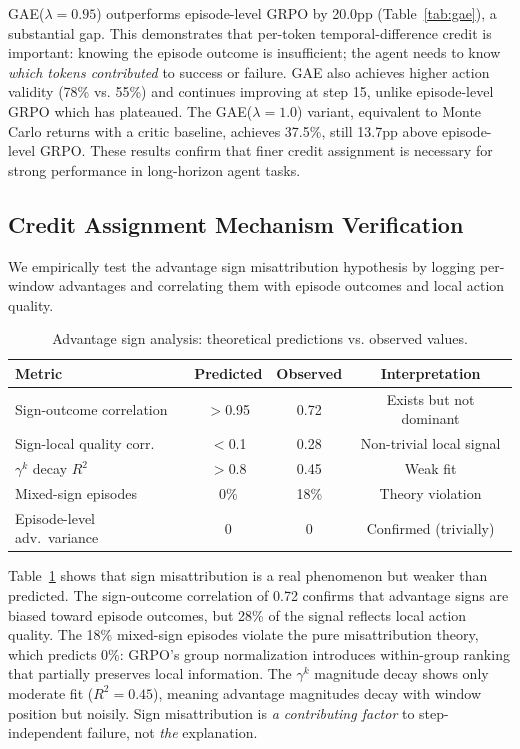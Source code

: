 \documentclass[11pt]{article}
\begin{document}
GAE($\lambda{=}0.95$) outperforms episode-level GRPO by 20.0pp (Table~\ref{tab:gae}), a substantial gap.
This demonstrates that per-token temporal-difference credit is important: knowing the episode outcome is insufficient; the agent needs to know \emph{which tokens contributed} to success or failure.
GAE also achieves higher action validity (78\% vs. 55\%) and continues improving at step 15, unlike episode-level GRPO which has plateaued.
The GAE($\lambda{=}1.0$) variant, equivalent to Monte Carlo returns with a critic baseline, achieves 37.5\%, still 13.7pp above episode-level GRPO.
These results confirm that finer credit assignment is necessary for strong performance in long-horizon agent tasks.

\subsection{Credit Assignment Mechanism Verification}

We empirically test the advantage sign misattribution hypothesis by logging per-window advantages and correlating them with episode outcomes and local action quality.

\begin{table}[h]
\centering
\caption{Advantage sign analysis: theoretical predictions vs. observed values.}
\label{tab:mechanism}
\begin{tabular}{lccc}
\toprule
Metric & Predicted & Observed & Interpretation \\
\midrule
Sign-outcome correlation   & $>$0.95 & 0.72 & Exists but not dominant \\
Sign-local quality corr.   & $<$0.1  & 0.28 & Non-trivial local signal \\
$\gamma^k$ decay $R^2$     & $>$0.8  & 0.45 & Weak fit \\
Mixed-sign episodes         & 0\%     & 18\% & Theory violation \\
Episode-level adv.\ variance & 0       & 0    & Confirmed (trivially) \\
\bottomrule
\end{tabular}
\end{table}

Table~\ref{tab:mechanism} shows that sign misattribution is a real phenomenon but weaker than predicted.
The sign-outcome correlation of 0.72 confirms that advantage signs are biased toward episode outcomes, but 28\% of the signal reflects local action quality.
The 18\% mixed-sign episodes violate the pure misattribution theory, which predicts 0\%: GRPO's group normalization introduces within-group ranking that partially preserves local information.
The $\gamma^k$ magnitude decay shows only moderate fit ($R^2 = 0.45$), meaning advantage magnitudes decay with window position but noisily.
Sign misattribution is \emph{a contributing factor} to step-independent failure, not \emph{the} explanation.
\end{document}
